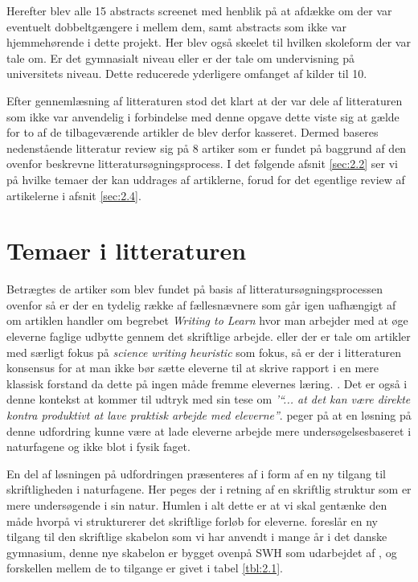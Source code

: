 Herefter blev alle 15 abstracts screenet med henblik på at afdække om der var eventuelt dobbeltgængere i mellem dem, samt abstracts som ikke var hjemmehørende i dette projekt. Her blev også skeelet til hvilken skoleform der var tale om. Er det gymnasialt niveau eller er der tale om undervisning på universitets niveau. Dette reducerede yderligere omfanget af kilder til 10.

Efter gennemlæsning af litteraturen stod det klart at der var dele af litteraturen som ikke var anvendelig i forbindelse med denne opgave dette viste sig at gælde for to af de tilbageværende artikler de blev derfor kasseret. Dermed baseres nedenstående litteratur review sig på 8 artiker som er fundet på baggrund af den ovenfor beskrevne litteratursøgningsprocess. I det følgende afsnit \vref{sec:2.2} ser vi på hvilke temaer der kan uddrages af artiklerne, forud for det egentlige review af artikelerne i afsnit \vref{sec:2.4}. 


\section{Temaer i litteraturen}
\label{sec:tem}

Betrægtes de artiker som blev fundet på basis af litteratursøgningsprocessen ovenfor så er der en tydelig række af fællesnævnere som går igen uafhængigt af om artiklen handler om begrebet \emph{Writing to Learn} hvor man arbejder med at øge eleverne faglige udbytte gennem det skriftlige arbejde. eller der er tale om artikler med særligt fokus på \emph{science writing heuristic} som fokus, så er der i litteraturen konsensus for at man ikke bør sætte eleverne til at skrive rapport i en mere klassisk forstand da dette på ingen måde fremme elevernes læring. \citep{Akkus2007, Atasoy2013, Burke2005, Keys1999}. Det er også i denne kontekst at \citet{Hodson2008} kommer til udtryk med sin tese om \emph{'``... at det kan være direkte kontra produktivt at lave praktisk arbejde med eleverne''}. \citet{Krogh2016,Dolin2014} peger på at en løsning på denne udfordring kunne være at lade eleverne arbejde mere undersøgelsesbaseret i naturfagene og ikke blot i fysik faget. 

En del af løsningen på udfordringen præsenteres af \citep{Keys1999, Burke2005} i form af en ny tilgang til skriftligheden i naturfagene. Her peges der i retning af en skriftlig struktur som er mere undersøgende i sin natur. Humlen i alt dette er at vi skal gentænke den måde hvorpå vi strukturerer det skriftlige forløb for eleverne. \citet{Burke2005} foreslår en ny tilgang til den skriftlige skabelon som vi har anvendt i mange år i det danske gymnasium, denne nye skabelon er bygget ovenpå SWH som udarbejdet af \citep{Keys1999}, og forskellen mellem de to tilgange er givet i tabel \vref{tbl:2.1}.

